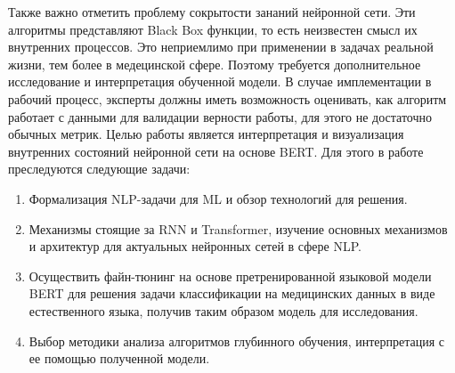 \newline
Также важно отметить проблему сокрытости зананий нейронной сети. Эти алгоритмы представляют Black Box функции, то есть неизвестен смысл их внутренних процессов. Это неприемлимо при применении в задачах реальной жизни, тем более в медецинской сфере. Поэтому требуется дополнительное исследование и интерпретация обученной модели. В случае имплементации в рабочий процесс, эксперты должны иметь возможность оценивать, как алгоритм работает с данными для валидации верности работы, для этого не достаточно обычных метрик.
\newline
Целью работы является интерпретация и визуализация внутренних состояний нейронной сети на основе BERT. Для этого в работе преследуются следующие задачи: 
\begin{enumerate}
\item  Формализация NLP-задачи для ML и обзор технологий для решения.
\item  Механизмы стоящие за RNN и Transformer, изучение основных механизмов и архитектур для актуальных нейронных сетей в сфере NLP.
\item  Осуществить файн-тюнинг на основе претренированной языковой модели BERT для решения задачи классификации на медицинских данных в виде естественного языка, получив таким образом модель для исследования.
\item  Выбор методики анализа алгоритмов глубинного обучения, интерпретация с ее помощью полученной модели.
\end{enumerate}